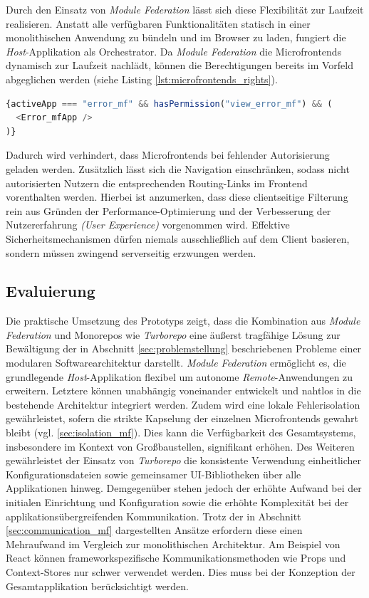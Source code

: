 Durch den Einsatz von \textit{Module Federation} lässt sich diese Flexibilität zur Laufzeit realisieren. Anstatt alle verfügbaren Funktionalitäten statisch in einer monolithischen Anwendung zu bündeln und im Browser zu laden, fungiert die \textit{Host}-Applikation als Orchestrator. Da \textit{Module Federation} die Microfrontends dynamisch zur Laufzeit nachlädt, können die Berechtigungen bereits im Vorfeld abgeglichen werden (siehe Listing \ref{lst:microfrontends_rights}).
\begin{lstlisting}[language=Javascript, caption={Rechtebasiertes Rendern der Microfrontends}, label={lst:microfrontends_rights}]
{activeApp === "error_mf" && hasPermission("view_error_mf") && (
  <Error_mfApp />
)}
\end{lstlisting}
Dadurch wird verhindert, dass Microfrontends bei fehlender Autorisierung geladen werden.
Zusätzlich lässt sich die Navigation einschränken, sodass nicht autorisierten Nutzern die entsprechenden Routing-Links im Frontend vorenthalten werden.
Hierbei ist anzumerken, dass diese clientseitige Filterung rein aus Gründen der Performance-Optimierung und der Verbesserung der Nutzererfahrung \textit{(User Experience)} vorgenommen wird. Effektive Sicherheitsmechanismen dürfen niemals ausschließlich auf dem Client basieren, sondern müssen zwingend serverseitig erzwungen werden.


\subsection{Evaluierung}
Die praktische Umsetzung des Prototyps zeigt, dass die Kombination aus \textit{Module Federation} und Monorepos wie \textit{Turborepo} eine äußerst tragfähige Lösung zur Bewältigung der in Abschnitt \ref{sec:problemstellung} beschriebenen Probleme einer modularen Softwarearchitektur darstellt. \textit{Module Federation} ermöglicht es, die grundlegende \textit{Host}-Applikation flexibel um autonome \textit{Remote}-Anwendungen zu erweitern. Letztere können unabhängig voneinander entwickelt und nahtlos in die bestehende Architektur integriert werden. Zudem wird eine lokale Fehlerisolation gewährleistet, sofern die strikte Kapselung der einzelnen Microfrontends gewahrt bleibt (vgl. \ref{sec:isolation_mf}). Dies kann die Verfügbarkeit des Gesamtsystems, insbesondere im Kontext von Großbaustellen, signifikant erhöhen. Des Weiteren gewährleistet der Einsatz von \textit{Turborepo} die konsistente Verwendung einheitlicher Konfigurationsdateien sowie gemeinsamer UI-Bibliotheken über alle Applikationen hinweg. Demgegenüber stehen jedoch der erhöhte Aufwand bei der initialen Einrichtung und Konfiguration sowie die erhöhte Komplexität bei der applikationsübergreifenden Kommunikation. Trotz der in Abschnitt \ref{sec:communication_mf} dargestellten Ansätze erfordern diese einen Mehraufwand im Vergleich zur monolithischen Architektur. Am Beispiel von React können frameworkspezifische Kommunikationsmethoden wie Props und Context-Stores nur schwer verwendet werden. Dies muss bei der Konzeption der Gesamtapplikation berücksichtigt werden.